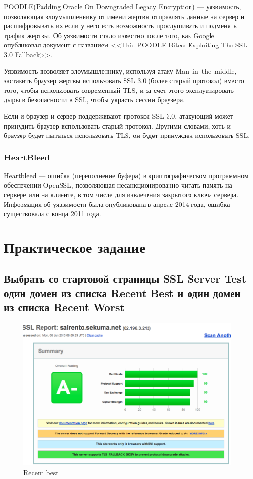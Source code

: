 \documentclass[utf8x, 12pt]{G7-32}
\begin{document}
	POODLE(Padding Oracle On Downgraded Legacy Encryption) --- уязвимость, позволяющая злоумышленнику от имени жертвы отправлять данные на сервер и расшифровывать их если у него есть возможность прослушивать и подменять трафик жертвы. Об уязвимости стало известно после того, как Google опубликовал документ с названием <<This POODLE Bites: Exploiting The SSL 3.0 Fallback>>.

	Уязвимость позволяет злоумышленнику, используя атаку Man--in--the--middle, заставить браузер жертвы использовать SSL 3.0 (более старый протокол) вместо того, чтобы использовать современный TLS, и за счет этого эксплуатировать дыры в безопасности в SSL, чтобы украсть сессии браузера.

	Если и браузер и сервер поддерживают протокол SSL 3.0, атакующий может принудить браузер использовать старый протокол. Другими  словами, хоть и браузер будет пытаться использовать TLS, он будет принужден использовать SSL.


\subsubsection{HeartBleed}
	Heartbleed --- ошибка (переполнение буфера) в криптографическом программном обеспечении OpenSSL, позволяющая несанкционированно читать память на сервере или на клиенте, в том числе для извлечения закрытого ключа сервера. Информация об уязвимости была опубликована в апреле 2014 года, ошибка существовала с конца 2011 года.


\newpage
\section{Практическое задание}

\subsection{Выбрать со стартовой страницы SSL Server Test один домен из списка Recent Best и один домен из списка Recent Worst}


\begin{figure}[hhh!]
	\begin{center}
		\includegraphics[width=14cm]{img/best}
	\end{center}
	\vspace{-5mm}\caption{Recent best}
\end{figure}
\end{document}
